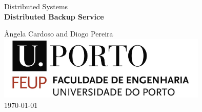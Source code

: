 

\begin{titlepage}
\begin{center}
 
\vspace*{3cm}

{\Large Distributed Systems}\\[2cm]

{\Huge \bfseries Distributed Backup Service \\[1cm]}

{\large \^Angela Cardoso and Diogo Pereira}\\[2cm]

\includegraphics[width=10cm]{feup_logo.jpg}\\[2cm]


{\large \today}

\end{center}
\end{titlepage}